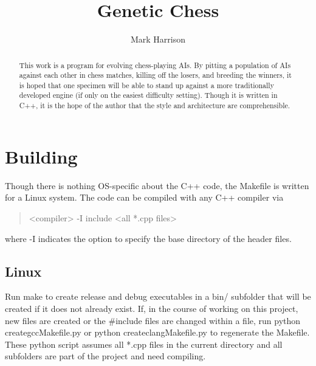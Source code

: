 \documentclass[letterpaper]{article}
\title{Genetic Chess}
\author{Mark Harrison}
\newcommand{\cpp}{C{\nobreak +}{\nobreak +}}
\newcommand{\code}[1]{\textsf{#1}}
\renewcommand{\_}{\allowbreak\textunderscore\allowbreak}
\begin{document}
\maketitle

\begin{abstract}
This work is a program for evolving chess-playing AIs.  By pitting a population of AIs against each other in chess matches, killing off the losers, and breeding the winners, it is hoped that one specimen will be able to stand up against a more traditionally developed engine (if only on the easiest difficulty setting). Though it is written in \cpp{}, it is the hope of the author that the style and architecture are comprehensible.
\end{abstract}

\tableofcontents{}


\section{Building}
Though there is nothing OS-specific about the \cpp{} code, the Makefile is written for a Linux system. The code can be compiled with any \cpp{} compiler via
\begin{quote}
	\code{<compiler> -I include <all *.cpp files>}
\end{quote}
where \code{-I} indicates the option to specify the base directory of the header files.

\subsection{Linux}
Run \code{make} to create release and debug executables in a \code{bin/} subfolder that will be created if it does not already exist. If, in the course of working on this project, new files are created or the \code{\#include} files are changed within a file, run \code{python create\_gcc\_Makefile.py} or \code{python create\_clang\_Makefile.py} to regenerate the Makefile. These python script assumes all \code{*.cpp} files in the current directory and all subfolders are part of the project and need compiling.
\end{document}
